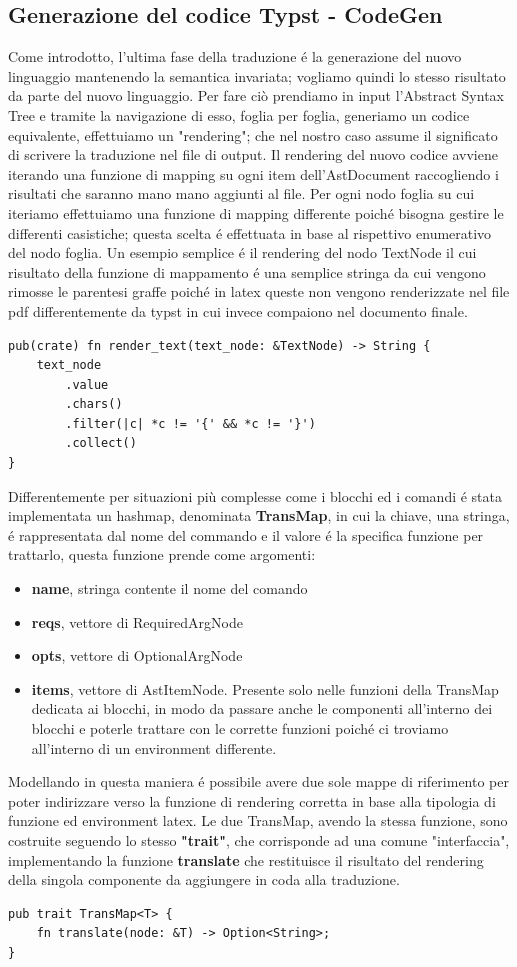 \documentclass{article}
\begin{document}
    \subsection{Generazione del codice Typst - CodeGen}
    Come introdotto, l'ultima fase della traduzione é la generazione del nuovo linguaggio mantenendo la semantica invariata; vogliamo quindi lo stesso risultato da parte del nuovo linguaggio. Per fare ciò prendiamo in input l'Abstract Syntax Tree e tramite la navigazione di esso, foglia per foglia, generiamo un codice equivalente, effettuiamo un "rendering"; che nel nostro caso assume il significato di scrivere la traduzione nel file di output.
    Il rendering del nuovo codice avviene iterando una funzione di mapping su ogni item dell'AstDocument raccogliendo i risultati che saranno mano mano aggiunti al file. Per ogni nodo foglia su cui iteriamo effettuiamo una funzione di mapping differente poiché bisogna gestire le differenti casistiche; questa scelta é effettuata in base al rispettivo enumerativo del nodo foglia. Un esempio semplice é il rendering del nodo TextNode il cui risultato della funzione di mappamento é una semplice stringa da cui vengono rimosse le parentesi graffe poiché in latex queste non vengono renderizzate nel file pdf differentemente da typst in cui invece compaiono nel documento finale.
    \begin{verbatim}
pub(crate) fn render_text(text_node: &TextNode) -> String {
    text_node
        .value
        .chars()
        .filter(|c| *c != '{' && *c != '}')
        .collect()
}
    \end{verbatim}
    Differentemente per situazioni più complesse come i blocchi ed i comandi é stata implementata un hashmap, denominata \textbf{TransMap}, in cui la chiave, una stringa, é rappresentata dal nome del commando e il valore é la specifica funzione per trattarlo, questa funzione prende come argomenti:
    \begin{itemize}
        \item \textbf{name}, stringa contente il nome del comando
        \item \textbf{reqs}, vettore di RequiredArgNode
        \item \textbf{opts}, vettore di OptionalArgNode
        \item \textbf{items}, vettore di AstItemNode. Presente solo nelle funzioni della TransMap dedicata ai blocchi, in modo da passare anche le componenti all'interno dei blocchi e poterle trattare con le corrette funzioni poiché ci troviamo all'interno di un environment differente.
    \end{itemize}
    Modellando in questa maniera é possibile avere due sole mappe di riferimento per poter indirizzare verso la funzione di rendering corretta in base alla tipologia di funzione ed environment latex. Le due TransMap, avendo la stessa funzione, sono costruite seguendo lo stesso \textbf{"trait"}, che corrisponde ad una comune "interfaccia", implementando la funzione \textbf{translate} che restituisce il risultato del rendering della singola componente da aggiungere in coda alla traduzione.
    \begin{verbatim}
pub trait TransMap<T> {
    fn translate(node: &T) -> Option<String>;
}
    \end{verbatim}
\end{document}
